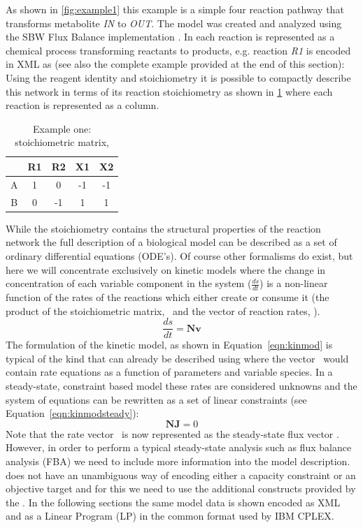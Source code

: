 As shown in \ref{fig:example1} this example is a simple four reaction
pathway that transforms metabolite \textit{IN} to \textit{OUT}. The model was created and analyzed using the \textsf{SBW Flux Balance} \FBC implementation \cite{sbwfba, sbw}. In \SBML each reaction is represented as a chemical process transforming reactants to products, e.g. reaction \textit{R1} is encoded in XML as (see also the complete example provided at the end of this section):
%
%
Using the reagent identity and stoichiometry it is possible to compactly describe this network in terms of its reaction stoichiometry as shown in \ref{tble:ex1nmat} where each reaction is represented as a column.
\begin{table}[h]
  \centering
    \begin{tabular}{c|cccc}
          & R1 & R2 & X1 & X2 \\ \hline
        A & 1 &  0 & -1 & -1 \\
        B & 0 & -1 &  1 &  1 \\
    \end{tabular}
  \caption{Example one: stoichiometric matrix, \Nmat}
  \label{tble:ex1nmat}
\end{table}
%
While the stoichiometry contains the structural properties of the reaction network the full description of a biological model can be described as a set of ordinary differential equations (ODE's). Of course other formalisms do exist, but here we will concentrate exclusively on kinetic models where the change in concentration of each variable component in the system ($\frac{ds}{dt}$) is a non-linear function of the rates of the reactions which either create or consume it (the product of the stoichiometric matrix, \Nmat\ and the vector of reaction rates, \vvec).
%
\begin{equation}\label{eqn:kinmod}
  \frac{ds}{dt} = \textbf{Nv}
\end{equation}
%
The formulation of the kinetic model, as shown in Equation~\ref{eqn:kinmod}
is typical of the kind that can already be described using \sbmlthreecore
where the vector \vvec\ would contain rate equations as a function of
parameters and variable species. In a steady-state, constraint based model these rates are considered unknowns and the system of equations can be rewritten as a set of linear constraints (see Equation~\ref{eqn:kinmodsteady}):
%
\begin{equation}\label{eqn:kinmodsteady}
  \textbf{NJ} = 0
\end{equation}
%
Note that the rate vector \vvec\ is now represented as the steady-state flux vector \Jvec. However, in order to perform a typical steady-state analysis such as flux balance analysis (FBA) we need to include more information into the model description. \sbmlthreecore does not have an unambiguous way of encoding either a capacity constraint or an objective target and for this we need to use the additional constructs provided by the \FBCPackage. In the following sections the same model data is shown encoded as XML and as a Linear Program (LP) in the common format used by IBM \textsf{CPLEX}.

